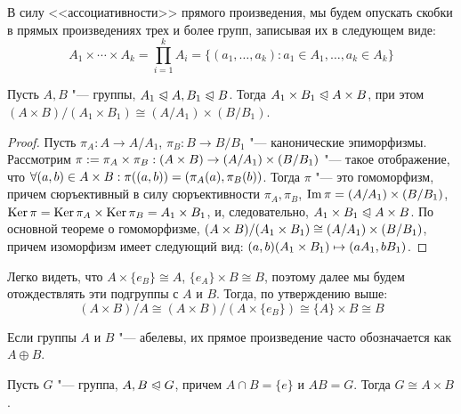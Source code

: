 \begin{note}
	В силу <<ассоциативности>> прямого произведения, мы будем опускать скобки в прямых произведениях трех и более групп, записывая их в следующем виде:
	\[A_1 \times \dotsb \times A_k = \prod_{i = 1}^kA_i = \{(a_1, \dotsc, a_k): a_1 \in A_1, \dotsc, a_k \in A_k\}\]
\end{note}

\begin{proposition}
	Пусть $A, B$ "--- группы, $A_1 \trianglelefteqslant A, B_1 \trianglelefteqslant B$. Тогда $A_1 \times B_1 \trianglelefteqslant A \times B$, при этом $(A \times B) / (A_1 \times B_1) \cong (A / A_1) \times (B / B_1)$.
\end{proposition}

\begin{proof}
	Пусть $\pi_A: A \to A/A_1$, $\pi_B: B \to B/B_1$ "--- канонические эпиморфизмы. Рассмотрим $\pi := \pi_A \times \pi_B: (A \times B) \hm\to (A / A_1) \times (B / B_1)$ "--- такое отображение, что $\forall (a, b) \hm\in A \times B: \pi((a, b)) = (\pi_A(a), \pi_B(b))$. Тогда $\pi$ "--- это гомоморфизм, причем сюръективный в силу сюръективности $\pi_A, \pi_B$, $\operatorname{Im}\pi = (A / A_1) \times (B / B_1)$, $\ke\pi \hm= \ke\pi_A \times \ke\pi_B = A_1 \times B_1$, и, следовательно, $A_1 \times B_1 \hm\normal A \times B$. По основной теореме о гомоморфизме, $(A \times B) / (A_1 \hm\times B_1) \hm\cong (A / A_1) \times (B / B_1)$, причем изоморфизм имеет следующий вид: $(a, b)(A_1 \times B_1) \hm\mapsto (aA_1, bB_1)$.
\end{proof}

\begin{note}
	Легко видеть, что $A \times \{e_B\} \cong A$, $\{e_A\} \times B \cong B$, поэтому далее мы будем отождествлять эти подгруппы с $A$ и $B$. Тогда, по утверждению выше:
	\[(A \times B)/A \cong (A \times B)/(A \times \{e_B\}) \cong \{A\} \times B \cong B\]
\end{note}

\begin{note}
	Если группы $A$ и $B$ "--- абелевы, их прямое произведение часто обозначается как $A \oplus B$.
\end{note}

\begin{theorem}
	Пусть $G$ "--- группа, $A, B \trianglelefteqslant G$, причем $A \cap B = \{e\}$ и $AB = G$. Тогда $G \cong A \times B$.
\end{theorem}

